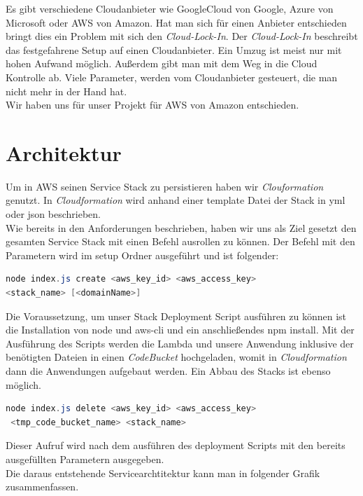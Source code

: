 \documentclass[a4paper, 12pt]{scrreprt}
\renewcommand\_{\textunderscore\allowbreak}
\begin{document}
Es gibt verschiedene Cloudanbieter wie GoogleCloud von Google, Azure von Microsoft oder AWS von Amazon. Hat man sich für einen Anbieter entschieden bringt dies ein Problem mit sich den \textit{Cloud-Lock-In}. Der \textit{Cloud-Lock-In} beschreibt das festgefahrene Setup auf einen Cloudanbieter. Ein Umzug ist meist nur mit hohen Aufwand möglich. Außerdem gibt man mit dem Weg in die Cloud Kontrolle ab. Viele Parameter, werden vom Cloudanbieter gesteuert, die man nicht mehr in der Hand hat. \\
Wir haben uns für unser Projekt für AWS von Amazon entschieden.

\chapter{Architektur}
Um in AWS seinen Service Stack zu persistieren haben wir \textit{Clouformation} genutzt. In \textit{Cloudformation} wird anhand einer template Datei der Stack in yml oder json beschrieben. \\
Wie bereits in den Anforderungen beschrieben, haben wir uns als Ziel gesetzt den gesamten Service Stack mit einen Befehl ausrollen zu können. Der Befehl mit den Parametern wird im setup Ordner ausgeführt und ist folgender:

\begin{lstlisting}[xleftmargin=\parindent,frame=L,mathescape=true, basicstyle=\small, language=Java, lineskip={1.0pt}]
node index.js create <aws_key_id> <aws_access_key> 
<stack_name> [<domainName>]
\end{lstlisting}

Die Voraussetzung, um unser Stack Deployment Script ausführen zu können ist die Installation von node und aws-cli und ein anschließendes npm install.
Mit der Ausführung des Scripts werden die Lambda und unsere Anwendung inklusive der benötigten Dateien in einen \textit{CodeBucket} hochgeladen, womit in \textit{Cloudformation} dann die Anwendungen aufgebaut werden. Ein Abbau des Stacks ist ebenso möglich.

\begin{lstlisting}[xleftmargin=\parindent,frame=L,mathescape=true, basicstyle=\small, language=Java, lineskip={1.0pt}]
node index.js delete <aws_key_id> <aws_access_key>
 <tmp_code_bucket_name> <stack_name>
\end{lstlisting}

Dieser Aufruf wird nach dem ausführen des deployment Scripts mit den bereits ausgefüllten Parametern ausgegeben. \\
Die daraus entstehende Servicearchtitektur kann man in folgender Grafik zusammenfassen.
\end{document}
